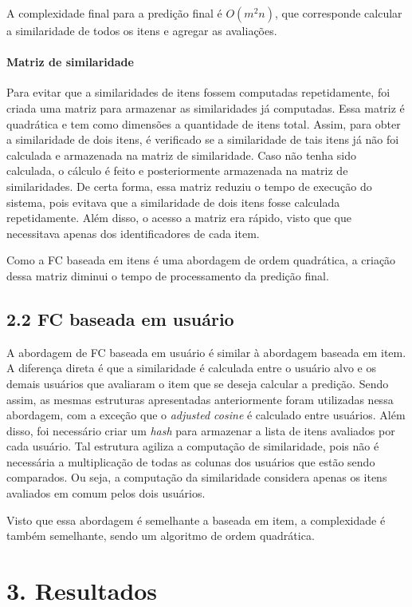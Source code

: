 \documentclass[brazil,a4paper,11pt]{article}
\begin{document}
A complexidade final para a predição final é $O(m^2n)$, que corresponde calcular a similaridade de todos os itens e agregar as avaliações.


\paragraph{Matriz de similaridade} Para evitar que a similaridades de itens fossem computadas repetidamente, foi criada uma matriz para armazenar as similaridades já computadas. Essa matriz é quadrática e tem como dimensões a quantidade de itens total. Assim, para obter a similaridade de dois itens, é verificado se a similaridade de tais itens já não foi calculada e armazenada na matriz de similaridade. Caso não tenha sido calculada, o cálculo é feito e posteriormente armazenada na matriz de similaridades. De certa forma, essa matriz reduziu o tempo de execução do sistema, pois evitava que a similaridade de dois itens fosse calculada repetidamente. Além disso, o acesso a matriz era rápido, visto que que necessitava apenas dos identificadores de cada item. 

Como a FC baseada em itens é uma abordagem de ordem quadrática, a criação dessa matriz diminui o tempo de processamento da predição final.


\subsection{2.2 FC baseada em usuário}

A abordagem de FC baseada em usuário é similar à abordagem baseada em item. A diferença direta é que a similaridade é calculada entre o usuário alvo e os demais usuários que avaliaram o item que se deseja calcular a predição. Sendo assim, as mesmas estruturas apresentadas anteriormente foram utilizadas nessa abordagem, com a exceção que o \textit{adjusted cosine} é calculado entre usuários. Além disso, foi necessário criar um \textit{hash} para armazenar a lista de itens avaliados por cada usuário. Tal estrutura agiliza a computação de similaridade, pois não é necessária a multiplicação de todas as colunas dos usuários que estão sendo comparados. Ou seja, a computação da similaridade considera apenas os itens avaliados em comum pelos dois usuários. 

Visto que essa abordagem é semelhante a baseada em item, a complexidade é também semelhante, sendo um algoritmo de ordem quadrática.

\section{3. Resultados}
\end{document}
